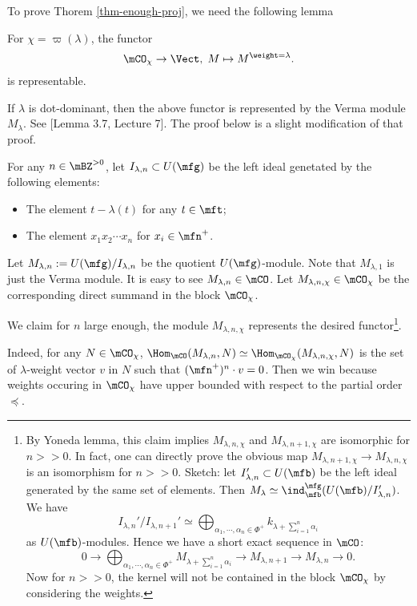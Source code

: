 	To prove Thorem \ref{thm-enough-proj}, we need the following lemma

	\begin{lem}
		\label{lem-weigth-reprentable}
		For $\chi = \varpi(\lambda)$, the functor
		\[
			\mCO_\chi \to \Vect,\; M \mapsto M^{\weight = \lambda}.
		\]
		is representable.
	\end{lem}

	\begin{rem}
		If $\lambda$ is dot-dominant, then the above functor is represented by the Verma module $M_\lambda$. See [Lemma 3.7, Lecture 7]. The proof below is a slight modification of that proof.
	\end{rem}

	\proof
		For any $n\in \mBZ^{>0}$, let $I_{\lambda,n}\subset U(\mfg)$ be the left ideal genetated by the following elements:
		\begin{itemize}
			\item The element $t-\lambda(t)$ for any $t\in \mft$;
			\item The element $x_1x_2\cdots x_n$ for $x_i\in \mfn^+$.
		\end{itemize}
		Let $M_{\lambda,n}:=U(\mfg)/I_{\lambda,n}$ be the quotient $U(\mfg)$-module. Note that $M_{\lambda,1}$ is just the Verma module. It is easy to see $M_{\lambda,n}\in \mCO$. Let $M_{\lambda,n,\chi}\in \mCO_\chi$ be the corresponding direct summand in the block $\mCO_\chi$.

		We claim for $n$ large enough, the module $M_{\lambda,n,\chi}$ represents the desired functor\footnote{By Yoneda lemma, this claim implies $M_{\lambda,n,\chi}$ and $M_{\lambda,n+1,\chi}$ are isomorphic for $n>>0$. In fact, one can directly prove the obvious map $M_{\lambda,n+1,\chi} \to M_{\lambda,n,\chi}$ is an isomorphism for $n>>0$. Sketch: let $I_{\lambda,n}' \subset U(\mfb)$ be the left ideal generated by the same set of elements. Then $M_{\lambda}\simeq \ind_\mfb^\mfg( U(\mfb)/I_{\lambda,n}' )$. We have 
		\[
			I_{\lambda,n}'/I_{\lambda,n+1}' \simeq \bigoplus_{\alpha_1,\cdots,\alpha_n\in \Phi^+} k_{\lambda+\sum_{i=1}^n \alpha_i}
		\]
		as $U(\mfb)$-modules. Hence we have a short exact sequence in $\mCO$:
		\[
			0 \to \bigoplus_{\alpha_1,\cdots,\alpha_n\in \Phi^+} M_{\lambda+\sum_{i=1}^n \alpha_i} \to M_{\lambda,n+1} \to M_{\lambda,n} \to 0.
		\]
		Now for $n>>0$, the kernel will not be contained in the block $\mCO_\chi$ by considering the weights.
		}. 

		Indeed, for any $N\in \mCO_\chi$, $\Hom_{\mCO}(M_{\lambda,n},N) \simeq \Hom_{\mCO_\chi}(M_{\lambda,n,\chi},N)$ is the set of $\lambda$-weight vector $v$ in $N$ such that $(\mfn^+)^n\cdot v = 0$. Then we win because weights occuring in $ \mCO_\chi$ have upper bounded with respect to the partial order $\preceq$.



